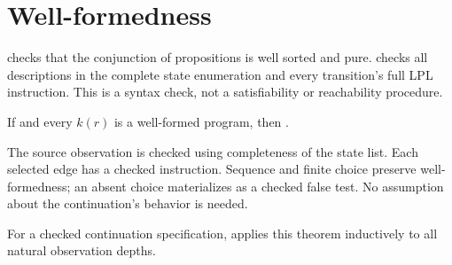\section{Well-formedness}\label{sec:typing}
 checks that the conjunction of propositions is
well sorted and pure.  checks all descriptions in the complete
state enumeration and every transition's full LPL instruction. This is a
syntax check, not a satisfiability or reachability procedure.

\begin{theorem}
If  and every $k(r)$ is a well-formed program,
then .
\end{theorem}
The source observation is checked using completeness of the state list.
Each selected edge has a checked instruction. Sequence and finite choice
preserve well-formedness; an absent choice materializes as a checked false
test. No assumption about the continuation's behavior is needed.

For a checked continuation specification,  applies
this theorem inductively to all natural observation depths.
